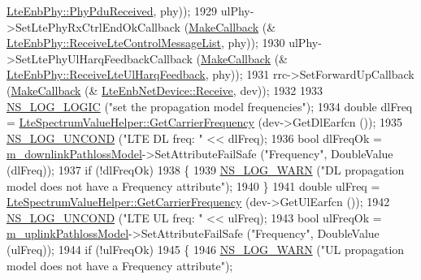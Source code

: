 \begin{DoxyCode}
      \hyperlink{classns3_1_1LteEnbPhy_a6f5e3a3285ccb75f962610bd43c0c436}{LteEnbPhy::PhyPduReceived}, phy));
1929         ulPhy->SetLtePhyRxCtrlEndOkCallback (\hyperlink{group__makecallbackmemptr_ga9376283685aa99d204048d6a4b7610a4}{MakeCallback} (&
      \hyperlink{classns3_1_1LteEnbPhy_aaf721c86e307ca0c9b2b33cad5c6dad4}{LteEnbPhy::ReceiveLteControlMessageList}, phy));
1930         ulPhy->SetLtePhyUlHarqFeedbackCallback (\hyperlink{group__makecallbackmemptr_ga9376283685aa99d204048d6a4b7610a4}{MakeCallback} (&
      \hyperlink{classns3_1_1LteEnbPhy_aea0e8c3c9fee3a8605db9d1d89a23986}{LteEnbPhy::ReceiveLteUlHarqFeedback}, phy));
1931         rrc->SetForwardUpCallback (\hyperlink{group__makecallbackmemptr_ga9376283685aa99d204048d6a4b7610a4}{MakeCallback} (&
      \hyperlink{classns3_1_1LteNetDevice_a52302e688e6fdf9abba088b2b26e5408}{LteEnbNetDevice::Receive}, dev));
1932 
1933         \hyperlink{group__logging_ga88acd260151caf2db9c0fc84997f45ce}{NS\_LOG\_LOGIC} (\textcolor{stringliteral}{"set the propagation model frequencies"});
1934         \textcolor{keywordtype}{double} dlFreq = \hyperlink{classns3_1_1LteSpectrumValueHelper_a07e5a6638c218927b61da7b75ae0b786}{LteSpectrumValueHelper::GetCarrierFrequency}
       (dev->GetDlEarfcn ());
1935         \hyperlink{log-macros-disabled_8h_a0b36e5e182b37194f85ef1c5e979fb2e}{NS\_LOG\_UNCOND} (\textcolor{stringliteral}{"LTE DL freq: "} << dlFreq);
1936         \textcolor{keywordtype}{bool} dlFreqOk = \hyperlink{classns3_1_1MmWaveHelper_aa6554e23ddc0a9bdadb5ea91f85307b0}{m\_downlinkPathlossModel}->SetAttributeFailSafe (\textcolor{stringliteral}{"Frequency"}, 
      DoubleValue (dlFreq));
1937         \textcolor{keywordflow}{if} (!dlFreqOk)
1938         \{
1939           \hyperlink{group__logging_gade7208b4009cdf0e25783cd26766f559}{NS\_LOG\_WARN} (\textcolor{stringliteral}{"DL propagation model does not have a Frequency attribute"});
1940         \}
1941         \textcolor{keywordtype}{double} ulFreq = \hyperlink{classns3_1_1LteSpectrumValueHelper_a07e5a6638c218927b61da7b75ae0b786}{LteSpectrumValueHelper::GetCarrierFrequency}
       (dev->GetUlEarfcn ());
1942         \hyperlink{log-macros-disabled_8h_a0b36e5e182b37194f85ef1c5e979fb2e}{NS\_LOG\_UNCOND} (\textcolor{stringliteral}{"LTE UL freq: "} << ulFreq);
1943         \textcolor{keywordtype}{bool} ulFreqOk = \hyperlink{classns3_1_1MmWaveHelper_a13bd21e36e3ef9f3c11aeca4eef3fc36}{m\_uplinkPathlossModel}->SetAttributeFailSafe (\textcolor{stringliteral}{"Frequency"}, 
      DoubleValue (ulFreq));
1944         \textcolor{keywordflow}{if} (!ulFreqOk)
1945         \{
1946           \hyperlink{group__logging_gade7208b4009cdf0e25783cd26766f559}{NS\_LOG\_WARN} (\textcolor{stringliteral}{"UL propagation model does not have a Frequency attribute"});

\end{DoxyCode}
